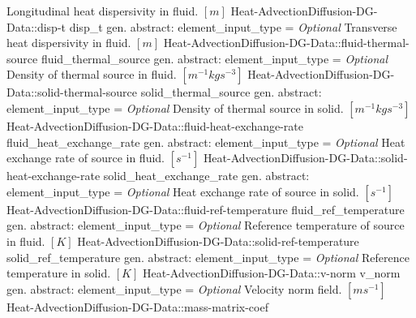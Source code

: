 \begin{RecordType}
			{{{Longitudinal heat dispersivity in fluid. }{$[m]$}%
}}
		\RecKey
			{Heat-AdvectionDiffusion-DG-Data::disp-t}
			{disp{\_}t}
			{{gen. abstract: }}{{element{\_}input{\_}type}{ = }}
			{ \it{Optional}}
			{{{Transverse heat dispersivity in fluid. }{$[m]$}%
}}
		\RecKey
			{Heat-AdvectionDiffusion-DG-Data::fluid-thermal-source}
			{fluid{\_}thermal{\_}source}
			{{gen. abstract: }}{{element{\_}input{\_}type}{ = }}
			{ \it{Optional}}
			{{{Density of thermal source in fluid. }{$[m^{-1}kgs^{-3}]$}%
}}
		\RecKey
			{Heat-AdvectionDiffusion-DG-Data::solid-thermal-source}
			{solid{\_}thermal{\_}source}
			{{gen. abstract: }}{{element{\_}input{\_}type}{ = }}
			{ \it{Optional}}
			{{{Density of thermal source in solid. }{$[m^{-1}kgs^{-3}]$}%
}}
		\RecKey
			{Heat-AdvectionDiffusion-DG-Data::fluid-heat-exchange-rate}
			{fluid{\_}heat{\_}exchange{\_}rate}
			{{gen. abstract: }}{{element{\_}input{\_}type}{ = }}
			{ \it{Optional}}
			{{{Heat exchange rate of source in fluid. }{$[s^{-1}]$}%
}}
		\RecKey
			{Heat-AdvectionDiffusion-DG-Data::solid-heat-exchange-rate}
			{solid{\_}heat{\_}exchange{\_}rate}
			{{gen. abstract: }}{{element{\_}input{\_}type}{ = }}
			{ \it{Optional}}
			{{{Heat exchange rate of source in solid. }{$[s^{-1}]$}%
}}
		\RecKey
			{Heat-AdvectionDiffusion-DG-Data::fluid-ref-temperature}
			{fluid{\_}ref{\_}temperature}
			{{gen. abstract: }}{{element{\_}input{\_}type}{ = }}
			{ \it{Optional}}
			{{{Reference temperature of source in fluid. }{$[K]$}%
}}
		\RecKey
			{Heat-AdvectionDiffusion-DG-Data::solid-ref-temperature}
			{solid{\_}ref{\_}temperature}
			{{gen. abstract: }}{{element{\_}input{\_}type}{ = }}
			{ \it{Optional}}
			{{{Reference temperature in solid. }{$[K]$}%
}}
		\RecKey
			{Heat-AdvectionDiffusion-DG-Data::v-norm}
			{v{\_}norm}
			{{gen. abstract: }}{{element{\_}input{\_}type}{ = }}
			{ \it{Optional}}
			{{{Velocity norm field. }{$[ms^{-1}]$}%
}}
		\RecKey
			{Heat-AdvectionDiffusion-DG-Data::mass-matrix-coef}

\end{RecordType}

